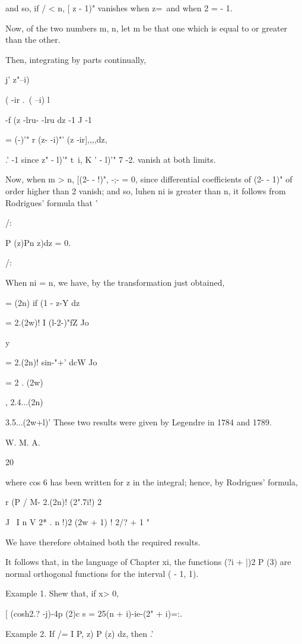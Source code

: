 {and so, if / < n, [ z - 1)" vanishes when z=\ and when 2 = - 1.

Now, of the two numbers m, n, let m be that one which is equal to or
greater than the other.

Then, integrating by parts continually,

j' z"--i)%

 ( -ir .\, ( --i) l

-f (z -lru- -lru dz -1 J -1

= (-)'" r (z- -i)"' (z -ir],,,,dz,

.' -1 since z" - l)'" t\ i, K ' - l)'" 7 -2.  vanish at both
limits.

Now, when m > n, [(2- - !)", -;- = 0, since differential coefficients
of (2- - 1)" of order higher than 2 vanish; and so, luhen ni is
greater than n, it follows from Rodrigues' formula that '

/:

P (z)Pn z)dz = 0.

/:

When ni = n, we have, by the transformation just obtained,

= (2n) if (1 - z-Y dz

= 2.(2w)! I (l-2-)"fZ Jo

y

= 2.(2n)! sin-"+' dcW Jo

= 2 . (2w)

, 2.4...(2n)

3.5...(2w+l)' These two results were given by Legendre in 1784 and
1789.

W. M. A.

20

%
%

where cos 6 has been written for z in the integral; hence, by
Rodrigues' formula,

r (P / M- 2.(2n)! (2".7i!) 2

J \ I n V 2* . n !)2 (2w + 1) ! 2/? + 1 "

We have therefore obtained both the required results.

It follows that, in the language of Chapter xi, the functions (?i +
|)2 P (3) are normal orthogonal functions for the interval ( - 1, 1).

Example 1. Shew that, if x> 0,

[ (cosh2.? -j)-4p (2)c s = 25(n + i)-ie-(2" + i)=:.

Example 2. If /= I P, z) P (z) dz, then .'


}
